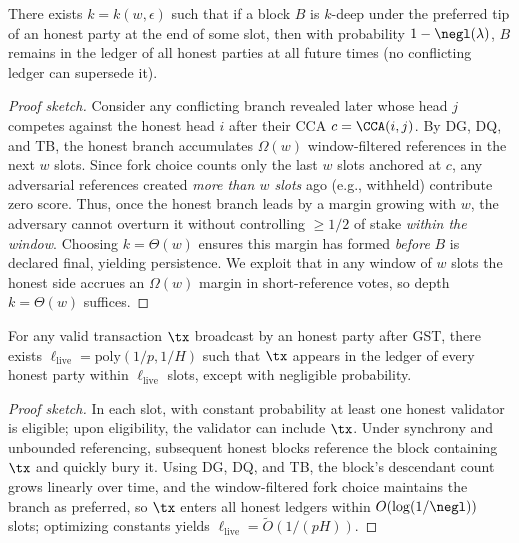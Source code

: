 {\begin{theorem}
\label{thm:ideal-safety}
There exists $k=k(w,\epsilon)$ such that if a block $B$ is $k$-deep under the preferred tip of an honest party at the end of some slot, then with probability $1-\negl(\lambda)$, $B$ remains in the ledger of all honest parties at all future times (no conflicting ledger can supersede it).
\end{theorem}
\begin{proof}[Proof sketch]
Consider any conflicting branch revealed later whose head $j$ competes against the honest head $i$ after their CCA $c=\CCA(i,j)$. By DG, DQ, and TB, the honest branch accumulates $\Omega(w)$ window-filtered references in the next $w$ slots. Since fork choice counts only the last $w$ slots anchored at $c$, any adversarial references created \emph{more than $w$ slots} ago (e.g., withheld) contribute zero score. Thus, once the honest branch leads by a margin growing with $w$, the adversary cannot overturn it without controlling $\ge 1/2$ of stake \emph{within the window}. Choosing $k=\Theta(w)$ ensures this margin has formed \emph{before} $B$ is declared final, yielding persistence. 
We exploit that in any window of $w$ slots the honest side accrues an $\Omega(w)$ margin in short-reference votes, so depth $k=\Theta(w)$ suffices.
\end{proof}

\begin{theorem}
\label{thm:ideal-liveness}
For any valid transaction $\tx$ broadcast by an honest party after GST, there exists $\ell_{\mathrm{live}}=\mathrm{poly}(1/p,1/H)$ such that $\tx$ appears in the ledger of every honest party within $\ell_{\mathrm{live}}$ slots, except with negligible probability.
\end{theorem}
\begin{proof}[Proof sketch]
In each slot, with constant probability at least one honest validator is eligible; upon eligibility, the validator can include $\tx$. Under synchrony and unbounded referencing, subsequent honest blocks reference the block containing $\tx$ and quickly bury it. Using DG, DQ, and TB, the block's descendant count grows linearly over time, and the window-filtered fork choice maintains the branch as preferred, so $\tx$ enters all honest ledgers within $O(\log(1/\negl))$ slots; optimizing constants yields $\ell_{\mathrm{live}}=\tilde{O}(1/(pH))$.
\end{proof}

}%



